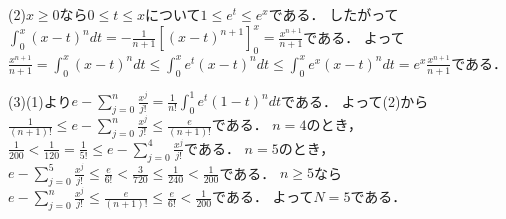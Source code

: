 \documentclass[
		book,
		head_space=20mm,
		foot_space=20mm,
		gutter=10mm,
		line_length=190mm
]{jlreq}
\begin{document}
	(2)$x\ge 0$なら$0\le t\le x$について$1\le e^t\le e^x$である．
	したがって$\int_0^x (x-t)^ndt=-\frac{1}{n+1}\left[ (x-t)^{n+1} \right]_0^x=\frac{x^{n+1}}{n+1}$である．
	よって$\frac{x^{n+1}}{n+1}=\int_0^x (x-t)^ndt\le \int_0^x e^t(x-t)^ndt\le \int_0^x e^x(x-t)^ndt=e^x\frac{x^{n+1}}{n+1}$である．

	(3)(1)より$e-\sum\limits_{j=0}^n\frac{x^j}{j!}=\frac{1}{n!}\int_0^1e^t(1-t)^ndt$である．
	よって(2)から$\frac{1}{(n+1)!}\le e-\sum\limits_{j=0}^n\frac{x^j}{j!}\le\frac{e}{(n+1)!}$である．
	$n=4$のとき，$\frac{1}{200}<\frac{1}{120}=\frac{1}{5!}\le e-\sum\limits_{j=0}^4\frac{x^j}{j!}$である．
	$n=5$のとき，$e-\sum\limits_{j=0}^5\frac{x^j}{j!}\le\frac{e}{6!}<\frac{3}{720}\le\frac{1}{240}<\frac{1}{200}$である．
	$n\ge 5$なら$e-\sum\limits_{j=0}^n\frac{x^j}{j!}\le\frac{e}{(n+1)!}\le \frac{e}{6!}<\frac{1}{200}$である．
	よって$N=5$である．
\end{document}
